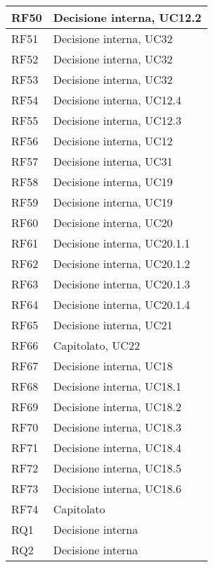 \begin{center}
\begin{longtable}{|C{5cm}|C{5cm}|}
        RF50 & Decisione interna, UC12.2 \\
        \hline
        RF51 & Decisione interna, UC32 \\
        \hline
        RF52 & Decisione interna, UC32 \\
        \hline
        RF53 & Decisione interna, UC32 \\
        \hline
        RF54 & Decisione interna, UC12.4 \\
        \hline
        RF55 & Decisione interna, UC12.3 \\
        \hline
        RF56 & Decisione interna, UC12 \\
        \hline
        RF57 & Decisione interna, UC31 \\
        \hline
        RF58 & Decisione interna, UC19 \\
        \hline
        RF59 & Decisione interna, UC19 \\
        \hline
        RF60 & Decisione interna, UC20 \\
        \hline
        RF61 & Decisione interna, UC20.1.1 \\
        \hline
        RF62 & Decisione interna, UC20.1.2 \\
        \hline
        RF63 & Decisione interna, UC20.1.3 \\
        \hline
        RF64 & Decisione interna, UC20.1.4 \\
        \hline
        RF65 & Decisione interna, UC21 \\
        \hline
        RF66 & Capitolato, UC22 \\
        \hline
        RF67 & Decisione interna, UC18 \\
        \hline
        RF68 & Decisione interna, UC18.1 \\
        \hline
        RF69 & Decisione interna, UC18.2 \\
        \hline
        RF70 & Decisione interna, UC18.3 \\
        \hline
        RF71 & Decisione interna, UC18.4 \\
        \hline
        RF72 & Decisione interna, UC18.5 \\
        \hline
        RF73 & Decisione interna, UC18.6 \\
        \hline
        RF74 & Capitolato \\
        \hline
        RQ1 & Decisione interna \\
        \hline
        RQ2 & Decisione interna \\

\end{longtable}
\end{center}
